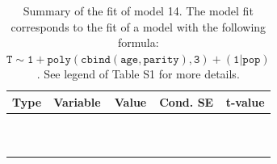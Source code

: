 \begin{table}

\caption{\label{tab:tab14}Summary of the fit of model 14. The model fit corresponds to the fit of a model with the following formula: {\small$\mathtt{T \sim 1 + poly(cbind(age, parity), 3) + (1 | pop)}$}. See legend of Table S1 for more details.}
\centering
\fontsize{8}{10}\selectfont
\begin{tabular}[t]{>{\raggedright\arraybackslash}p{3cm}>{\raggedright\arraybackslash}p{5cm}rrr}
\toprule
Type & Variable & Value & Cond. SE & t-value\\
\midrule
\cellcolor{gray!6}{fixed effects} & \cellcolor{gray!6}{$\beta_1$} & \cellcolor{gray!6}{-4.08} & \cellcolor{gray!6}{0.111} & \cellcolor{gray!6}{-36.8}\\
\cellcolor{gray!6}{} & \cellcolor{gray!6}{$\beta_{\mathtt{age}}$} & \cellcolor{gray!6}{71} & \cellcolor{gray!6}{30.7} & \cellcolor{gray!6}{2.32}\\
\cellcolor{gray!6}{} & \cellcolor{gray!6}{$\beta_{\mathtt{age}^2}$} & \cellcolor{gray!6}{-60.7} & \cellcolor{gray!6}{17} & \cellcolor{gray!6}{-3.57}\\
\cellcolor{gray!6}{} & \cellcolor{gray!6}{$\beta_{\mathtt{age}^3}$} & \cellcolor{gray!6}{-47.2} & \cellcolor{gray!6}{16.3} & \cellcolor{gray!6}{-2.9}\\
\cellcolor{gray!6}{} & \cellcolor{gray!6}{$\beta_{\mathtt{parity}}$} & \cellcolor{gray!6}{1.54} & \cellcolor{gray!6}{39.4} & \cellcolor{gray!6}{0.0393}\\
\cellcolor{gray!6}{} & \cellcolor{gray!6}{$\beta_{\mathtt{age}\times\mathtt{parity}}$} & \cellcolor{gray!6}{-4468} & \cellcolor{gray!6}{11667} & \cellcolor{gray!6}{-0.383}\\
\cellcolor{gray!6}{} & \cellcolor{gray!6}{$\beta_{\mathtt{age}^2\times\mathtt{parity}}$} & \cellcolor{gray!6}{7856} & \cellcolor{gray!6}{8568} & \cellcolor{gray!6}{0.917}\\
\cellcolor{gray!6}{} & \cellcolor{gray!6}{$\beta_{\mathtt{parity}^2}$} & \cellcolor{gray!6}{19.3} & \cellcolor{gray!6}{26.7} & \cellcolor{gray!6}{0.721}\\
\cellcolor{gray!6}{} & \cellcolor{gray!6}{$\beta_{\mathtt{age}\times\mathtt{parity}^2}$} & \cellcolor{gray!6}{-4441} & \cellcolor{gray!6}{7983} & \cellcolor{gray!6}{-0.556}\\
\cellcolor{gray!6}{} & \cellcolor{gray!6}{$\beta_{\mathtt{parity}^3}$} & \cellcolor{gray!6}{-18.8} & \cellcolor{gray!6}{13.9} & \cellcolor{gray!6}{-1.35}\\

\end{tabular}
\end{table}
